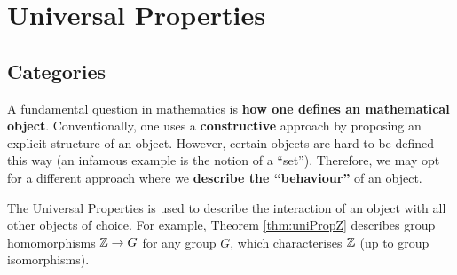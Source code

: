 \documentclass[math]{amznotes}
\theoremstyle{remark}
\newcommand{\0}{\mathbf{0}}
\newcommand{\1}{\mathbf{1}}
\begin{document}
\chapter{Universal Properties}
\section{Categories}
A fundamental question in mathematics is \textbf{how one defines an mathematical object}. Conventionally, one uses a \textbf{constructive} approach by proposing an explicit structure of an object. However, certain objects are hard to be defined this way (an infamous example is the notion of a ``set''). Therefore, we may opt for a different approach where we \textbf{describe the ``behaviour''} of an object.

The Universal Properties is used to describe the interaction of an object with all other objects of choice. For example, Theorem \ref{thm:uniPropZ} describes group homomorphisms $\mathbb{Z} \to G$ for any group $G$, which characterises $\mathbb{Z}$ (up to group isomorphisms).
\end{document}
